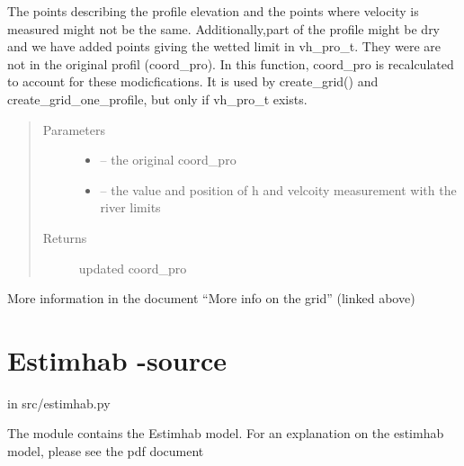 \documentclass[letterpaper,10pt,english]{sphinxmanual}
\begin{document}
\begin{fulllineitems}
\label{\detokenize{index:src.manage_grid_8.update_coord_pro_with_vh_pro}}
The points describing the profile elevation and the points where velocity is measured might not be the same.
Additionally,part of the profile might be dry and we have added points giving the wetted limit in vh\_pro\_t. They were
are not in the original profil (coord\_pro). In this function,
coord\_pro is recalculated to account for these modicfications. It is used by create\_grid() and
create\_grid\_one\_profile, but only if vh\_pro\_t exists.
\begin{quote}\begin{description}
\item[{Parameters}] \leavevmode\begin{itemize}
\item {} 
 -- the original coord\_pro

\item {} 
 -- the value and position of h and velcoity measurement with the river limits

\end{itemize}

\item[{Returns}] \leavevmode
updated coord\_pro

\end{description}\end{quote}

More information in the document ``More info on the grid'' (linked above)

\end{fulllineitems}



\section{Estimhab -source}
\label{\detokenize{index:estimhab-source}}
in src/estimhab.py

The module contains the Estimhab model. For an explanation on the estimhab model, please see
the pdf document 
\label{\detokenize{index:module-src.estimhab}}
\end{document}
